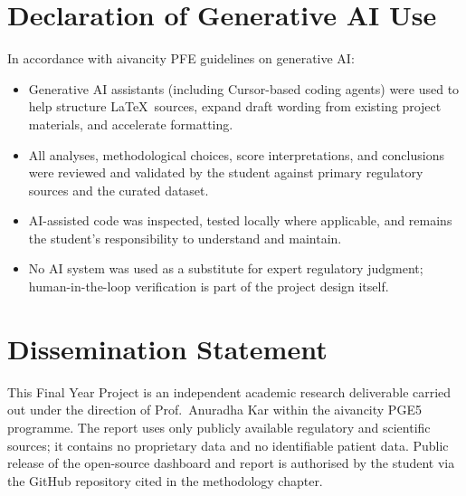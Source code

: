 \section{Declaration of Generative AI Use}
\label{app:genai}

In accordance with aivancity PFE guidelines on generative AI:
\begin{itemize}
  \item Generative AI assistants (including Cursor-based coding agents) were used to help structure \LaTeX\ sources, expand draft wording from existing project materials, and accelerate formatting.
  \item All analyses, methodological choices, score interpretations, and conclusions were reviewed and validated by the student against primary regulatory sources and the curated dataset.
  \item AI-assisted code was inspected, tested locally where applicable, and remains the student's responsibility to understand and maintain.
  \item No AI system was used as a substitute for expert regulatory judgment; human-in-the-loop verification is part of the project design itself.
\end{itemize}

\section{Dissemination Statement}
\label{app:auth}

This Final Year Project is an independent academic research deliverable carried out under the
direction of Prof.\ Anuradha Kar within the aivancity PGE5 programme. The report uses only
publicly available regulatory and scientific sources; it contains no proprietary data and no
identifiable patient data. Public release of the open-source dashboard and report is
authorised by the student via the GitHub repository cited in the methodology chapter.
